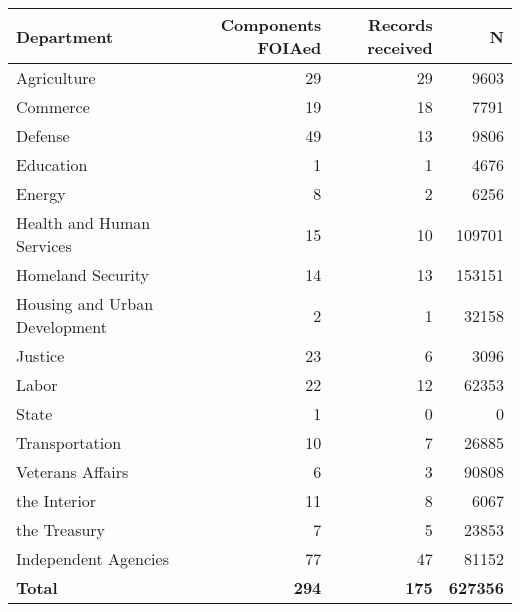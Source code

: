 
\begin{tabular}{lrrr}
\toprule
Department & Components FOIAed & Records received & N\\
\midrule
Agriculture & 29 & 29 & 9603\\
Commerce & 19 & 18 & 7791\\
Defense & 49 & 13 & 9806\\
Education & 1 & 1 & 4676\\
Energy & 8 & 2 & 6256\\
\addlinespace
Health and Human Services & 15 & 10 & 109701\\
Homeland Security & 14 & 13 & 153151\\
Housing and Urban Development & 2 & 1 & 32158\\
Justice & 23 & 6 & 3096\\
Labor & 22 & 12 & 62353\\
\addlinespace
State & 1 & 0 & 0\\
Transportation & 10 & 7 & 26885\\
Veterans Affairs & 6 & 3 & 90808\\
the Interior & 11 & 8 & 6067\\
the Treasury & 7 & 5 & 23853\\
\addlinespace
Independent Agencies & 77 & 47 & 81152\\
\midrule
\textbf{Total} & \textbf{294} & \textbf{175} & \textbf{627356}\\
\bottomrule
\end{tabular}